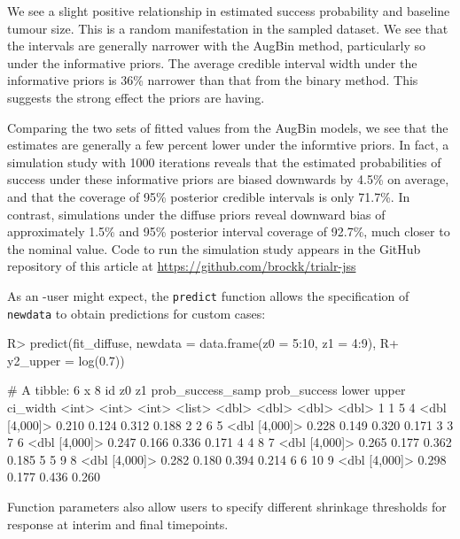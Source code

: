 \documentclass[article]{jss}
\begin{document}
We see a slight positive relationship in estimated success probability
and baseline tumour size. This is a random manifestation in the sampled
dataset. We see that the intervals are generally narrower with the
AugBin method, particularly so under the informative priors. The average
credible interval width under the informative priors is 36\% narrower
than that from the binary method. This suggests the strong effect the
priors are having.

Comparing the two sets of fitted values from the AugBin models, we see
that the estimates are generally a few percent lower under the
informtive priors. In fact, a simulation study with 1000 iterations
reveals that the estimated probabilities of success under these
informative priors are biased downwards by 4.5\% on average, and that
the coverage of 95\% posterior credible intervals is only 71.7\%. In
contrast, simulations under the diffuse priors reveal downward bias of
approximately 1.5\% and 95\% posterior interval coverage of 92.7\%, much
closer to the nominal value. Code to run the simulation study appears in
the GitHub repository of this article at
\url{https://github.com/brockk/trialr-jss}

As an -user might expect, the \texttt{predict} function
allows the specification of \texttt{newdata} to obtain predictions for
custom cases:

\begin{CodeChunk}

\begin{CodeInput}
R> predict(fit_diffuse, newdata = data.frame(z0 = 5:10, z1 = 4:9), 
R+         y2_upper = log(0.7))
\end{CodeInput}

\begin{CodeOutput}
# A tibble: 6 x 8
     id    z0    z1 prob_success_samp prob_success lower upper ci_width
  <int> <int> <int> <list>                   <dbl> <dbl> <dbl>    <dbl>
1     1     5     4 <dbl [4,000]>            0.210 0.124 0.312    0.188
2     2     6     5 <dbl [4,000]>            0.228 0.149 0.320    0.171
3     3     7     6 <dbl [4,000]>            0.247 0.166 0.336    0.171
4     4     8     7 <dbl [4,000]>            0.265 0.177 0.362    0.185
5     5     9     8 <dbl [4,000]>            0.282 0.180 0.394    0.214
6     6    10     9 <dbl [4,000]>            0.298 0.177 0.436    0.260
\end{CodeOutput}
\end{CodeChunk}

Function parameters also allow users to specify different shrinkage
thresholds for response at interim and final timepoints.
\end{document}
